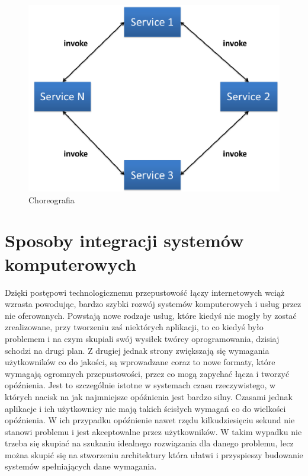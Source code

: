 \begin{figure}[!h]
	\centering
	\includegraphics[scale=0.75]{choreogragia.png} 
	\caption{Choreografia}
\end{figure}

\section{Sposoby integracji systemów komputerowych}
Dzięki postępowi technologicznemu przepustowość łączy internetowych wciąż wzrasta powodując, bardzo szybki rozwój systemów komputerowych i usług przez nie oferowanych. Powstają nowe rodzaje usług, które kiedyś nie mogły by zostać zrealizowane, przy tworzeniu zaś niektórych aplikacji, to co kiedyś było problemem i na czym skupiali swój wysiłek twórcy oprogramowania, dzisiaj schodzi na drugi plan. Z drugiej jednak strony zwiększają się wymagania użytkowników co do jakości, są wprowadzane coraz to nowe formaty, które wymagają ogromnych przepustowości, przez co mogą zapychać łącza i tworzyć opóźnienia. Jest to szczególnie istotne w systemach czasu rzeczywistego, w których nacisk na jak najmniejsze opóźnienia jest bardzo silny. Czasami jednak aplikacje i ich użytkownicy nie mają takich ścisłych wymagań co do wielkości opóźnienia. W ich przypadku opóźnienie nawet rzędu kilkudziesięciu sekund nie stanowi problemu i jest akceptowalne przez użytkowników. W takim wypadku nie trzeba się skupiać na szukaniu idealnego rozwiązania dla danego problemu, lecz można skupić się na stworzeniu architektury która ułatwi i przyspieszy budowanie systemów spełniających dane wymagania.

